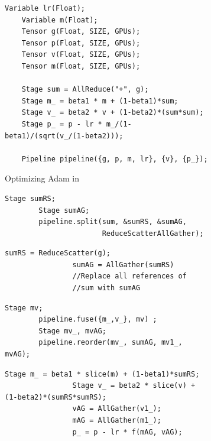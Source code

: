 \begin{figure}[t]
    \small
\begin{subfigure}{0.49\textwidth}
    \begin{lstlisting}[language=DSL]
    Variable lr(Float);
    Variable m(Float);
    Tensor g(Float, SIZE, GPUs);
    Tensor p(Float, SIZE, GPUs);
    Tensor v(Float, SIZE, GPUs);
    Tensor m(Float, SIZE, GPUs);
    
    Stage sum = AllReduce("+", g);
    Stage m_ = beta1 * m + (1-beta1)*sum;
    Stage v_ = beta2 * v + (1-beta2)*(sum*sum);
    Stage p_ = p - lr * m_/(1-beta1)/(sqrt(v_/(1-beta2)));
    
    Pipeline pipeline({g, p, m, lr}, {v}, {p_});
\end{lstlisting}
\caption{Optimizing  Adam in \tool }
    \label{fig:traditional-sgd}
\end{subfigure}

\begin{subfigure}{0.45\textwidth}
\begin{lstlisting}[language=DSL]     
        Stage sumRS;
        Stage sumAG;
        pipeline.split(sum, &sumRS, &sumAG, 
                       ReduceScatterAllGather); 
\end{lstlisting}
\caption{}
\end{subfigure}
\begin{subfigure}{0.45\textwidth}
        \begin{lstlisting}[language=DSL]     
                sumRS = ReduceScatter(g); 
                sumAG = AllGather(sumRS)
                //Replace all references of 
                //sum with sumAG
        \end{lstlisting}
        \caption{}
\end{subfigure}

\begin{subfigure}{0.45\textwidth}
\begin{lstlisting}[language=DSL]    
        Stage mv;
        pipeline.fuse({m_,v_}, mv) ;
        Stage mv_, mvAG;
        pipeline.reorder(mv_, sumAG, mv1_, mvAG); 
\end{lstlisting}
\caption{}
\end{subfigure}
\begin{subfigure}{0.45\textwidth}
        \begin{lstlisting}[language=DSL]     
                Stage m_ = beta1 * slice(m) + (1-beta1)*sumRS;
                Stage v_ = beta2 * slice(v) + (1-beta2)*(sumRS*sumRS);
                vAG = AllGather(v1_);
                mAG = AllGather(m1_);
                p_ = p - lr * f(mAG, vAG);
        \end{lstlisting}
        \caption{}
\end{subfigure}


\end{figure}
